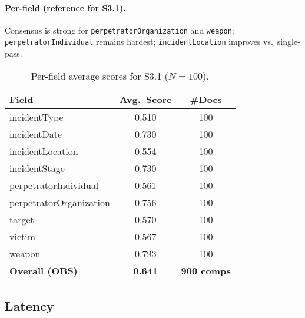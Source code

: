 \paragraph{Per-field (reference for S3.1).}
Consensus is strong for \texttt{perpetratorOrganization} and \texttt{weapon}; \texttt{perpetratorIndividual} remains hardest; \texttt{incidentLocation} improves vs.\ single-pass.

\begin{table}[H]
    \centering
    \caption{Per-field average scores for S3.1 ($N{=}100$).}
    \label{tab:s3-perfield}
    \begin{tabular}{lcc}
        \toprule
        Field & Avg.\ Score & \#Docs \\
        \midrule
        incidentType & 0.510 & 100 \\
        incidentDate & 0.730 & 100 \\
        incidentLocation & 0.554 & 100 \\
        incidentStage & 0.730 & 100 \\
        perpetratorIndividual & 0.561 & 100 \\
        perpetratorOrganization & 0.756 & 100 \\
        target & 0.570 & 100 \\
        victim & 0.567 & 100 \\
        weapon & 0.793 & 100 \\
        \midrule
        \textbf{Overall (OBS)} & \textbf{0.641} & \textbf{900 comps} \\
        \bottomrule
    \end{tabular}
\end{table}

\subsection*{Latency}

